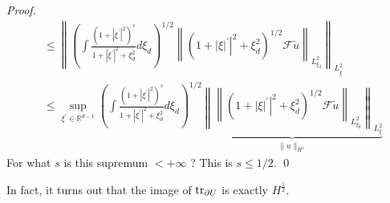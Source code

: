 \begin{proof}
$$\begin{aligned}
&\leq\left\|\left(\int \frac{\left(1+\left|\xi^{\prime}\right|^{2}\right)^{s}}{1+\left|\xi^{\prime}\right|^{2}+\xi_{d}^{2}} d \xi_{d}\right)^{1 / 2}\left\|\left(1+\left.|\xi|^{\prime}\right|^{2}+\xi_{d}^{2}\right)^{1 / 2} \mathcal{F} \widetilde{u}\right\|_{L_{\xi_{d}}^{2}}\right\|_{L_{\xi^{\prime}}^{2}} \\
&\leq \sup _{\xi^{\prime} \in \mathbb{R}^{d-1}}\left(\int \frac{\left(1+\left|\xi^{\prime}\right|^{2}\right)^{s}}{1+\left|\xi^{\prime}\right|^{2}+\xi_{d}^{2}} d \xi_{d}\right)^{1 / 2} \underbrace{\left \|\left\|\left(1+\left.|\xi|^{\prime}\right|^{2}+\xi_{d}^{2}\right)^{1 / 2} \mathcal{F} \widetilde{u}\right\|_{L_{\xi_{d}}^{2}} \right\|_{L_{\xi}^{2}}}_{\|u\|_{H^{1}}}
\end{aligned}
$$
For what $s$ is this supremum $<+\infty$ ? This is $s \leq 1 / 2$.
\qed
\end{proof}

In fact, it turns out that the image of $\mathop{\mathrm{tr}}_{\partial U}$ is exactly $H^{\frac{1}{2}}$. 

